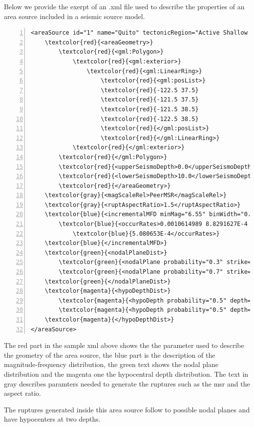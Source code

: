 Below we provide the exerpt of an .xml file used to describe the properties of
an area source included in a seismic source model.
\begin{Verbatim}[frame=single, commandchars=\\\{\}, fontsize=\footnotesize,
numbers=left, numbersep=2pt]
<areaSource id="1" name="Quito" tectonicRegion="Active Shallow Crust">
    \textcolor{red}{<areaGeometry>}
        \textcolor{red}{<gml:Polygon>}
            \textcolor{red}{<gml:exterior>}
                \textcolor{red}{<gml:LinearRing>}
                    \textcolor{red}{<gml:posList>}
                    \textcolor{red}{-122.5 37.5}
                    \textcolor{red}{-121.5 37.5}
                    \textcolor{red}{-121.5 38.5}
                    \textcolor{red}{-122.5 38.5}
                    \textcolor{red}{</gml:posList>}
                    \textcolor{red}{</gml:LinearRing>}
            \textcolor{red}{</gml:exterior>}
        \textcolor{red}{</gml:Polygon>}
        \textcolor{red}{<upperSeismoDepth>0.0</upperSeismoDepth>}
        \textcolor{red}{<lowerSeismoDepth>10.0</lowerSeismoDepth>}
        \textcolor{red}{</areaGeometry>}
    \textcolor{gray}{<magScaleRel>PeerMSR</magScaleRel>}
    \textcolor{gray}{<ruptAspectRatio>1.5</ruptAspectRatio>}
    \textcolor{blue}{<incrementalMFD minMag="6.55" binWidth="0.1">}
        \textcolor{blue}{<occurRates>0.0010614989 8.8291627E-4 7.3437777E-4 6.108288E-4}
		    \textcolor{blue}{5.080653E-4</occurRates>}
    \textcolor{blue}{</incrementalMFD>}
    \textcolor{green}{<nodalPlaneDist>}
        \textcolor{green}{<nodalPlane probability="0.3" strike="0.0" dip="90.0" rake="0.0"/>}
        \textcolor{green}{<nodalPlane probability="0.7" strike="90.0" dip="45.0" rake="90.0"/>}
    \textcolor{green}{</nodalPlaneDist>}
    \textcolor{magenta}{<hypoDepthDist>}
        \textcolor{magenta}{<hypoDepth probability="0.5" depth="4.0" />}
        \textcolor{magenta}{<hypoDepth probability="0.5" depth="8.0" />}
    \textcolor{magenta}{</hypoDepthDist>}
</areaSource>
\end{Verbatim}
The red part in the sample xml above shows the the parameter used to 
describe the geometry of the area source, the blue part is the description
of the magnitude-frequency distribution, the green text shows the nodal 
plane distribution and the magenta one the hypocentral depth distribution.
The text in gray describes paramters needed to generate the ruptures 
such as the \gls{msr} and the aspect ratio.

The ruptures generated inside this area source follow to possible nodal 
planes and have hypocenters at two depths. 
%

